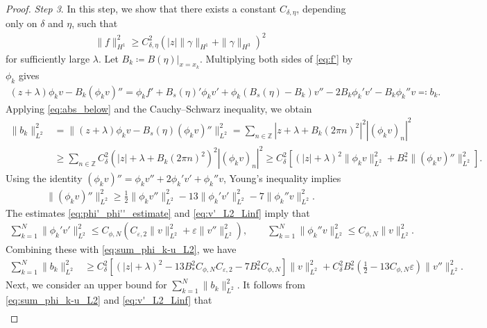 \documentclass[10pt,a4paper]{amsart}
\begin{document}
\begin{proof}
\textit{Step 3}.
In this step, we show that there exists a constant $C_{\delta,\eta}$, depending only on $\delta$ and $\eta$, such that
\begin{align*}
    \|f\|_{H^1}^2 \ge C_{\delta,\eta}^2\left(|z|\|\gamma\|_{H^1} + \|\gamma\|_{H^3}\right)^2
\end{align*}
for sufficiently large $\lambda$.
Let $B_k\coloneqq B(\eta)|_{x=x_k}$.
Multiplying both sides of \eqref{eq:f'} by $\phi_k$ gives
\begin{align*}
    (z+\lambda)\phi_kv - B_k(\phi_kv)''
    =\phi_kf'+B_s(\eta)'\phi_kv'+\phi_k(B_s(\eta)-B_k)v''-2B_k\phi_k'v'-B_k\phi_k''v
    \eqqcolon b_k.
\end{align*}
Applying \eqref{eq:abs_below} and the Cauchy--Schwarz inequality, we obtain
\begin{align*}
    \|b_k\|_{L^2}^2
    &= \|(z+\lambda)\phi_kv - B_s(\eta)(\phi_kv)''\|_{L^2}^2
    =\sum_{n\in\mathbb{Z}}|z+\lambda+B_k(2\pi n)^2|^2|(\phi_kv)_n|^2\\
    &\ge\sum_{n\in\mathbb{Z}}C_\delta^2(|z|+\lambda+B_k(2\pi n)^2)^2|(\phi_kv)_n|^2
    \ge C_\delta^2\left[(|z|+\lambda)^2\|\phi_kv\|_{L^2}^2 + B_\ast^2\|(\phi_kv)''\|_{L^2}^2\right].
\end{align*}
Using the identity $(\phi_kv)'' = \phi_kv''+2\phi_k'v'+\phi_k''v$, Young's inequality implies
\begin{align*}
    \|(\phi_kv)''\|_{L^2}^2
    \ge\frac{1}{2}\|\phi_kv''\|_{L^2}^2 - 13\|\phi_k'v'\|_{L^2}^2 - 7\|\phi_k''v\|_{L^2}^2.
\end{align*}
The estimates \eqref{eq:phi'_phi''_estimate} and \eqref{eq:v'_L2_Linf} imply that
\begin{align*}
    \sum_{k=1}^N\|\phi_k'v'\|_{L^2}^2
    \le C_{\phi,N}\left(C_{\varepsilon,2}\|v\|_{L^2}^2 + \varepsilon\|v''\|_{L^2}^2\right),\qquad
    \sum_{k=1}^N\|\phi_k''v\|_{L^2}^2 \le C_{\phi,N}\|v\|_{L^2}^2.
\end{align*}
Combining these with \eqref{eq:sum_phi_k-u_L2}, we have
\begin{align}
    \sum_{k=1}^N\|b_k\|_{L^2}^2
    &\ge
    C_\delta^2\left[(|z|+\lambda)^2 - 13B_\ast^2C_{\phi,N}C_{\varepsilon,2} - 7B_\ast^2C_{\phi,N}\right]\|v\|_{L^2}^2 + C_\delta^2B_\ast^2\left(\frac{1}{2}-13C_{\phi,N}\varepsilon\right)\|v''\|_{L^2}^2.
    \label{eq:sum_bk_lower}
\end{align}
Next, we consider an upper bound for $\sum_{k=1}^N\|b_k\|_{L^2}^2$.
It follows from \eqref{eq:sum_phi_k-u_L2} and \eqref{eq:v'_L2_Linf} that
\begin{align*}

\end{align*}
\end{proof}
\end{document}
